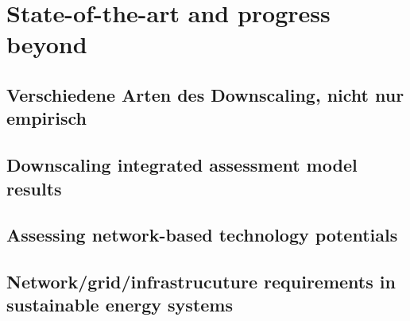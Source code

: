 \section{State-of-the-art and progress beyond}
\subsection{Verschiedene Arten des Downscaling, nicht nur empirisch}

\subsection{Downscaling integrated assessment model results}

\subsection{Assessing network-based technology potentials}

\subsection{Network/grid/infrastrucuture requirements in sustainable energy systems}